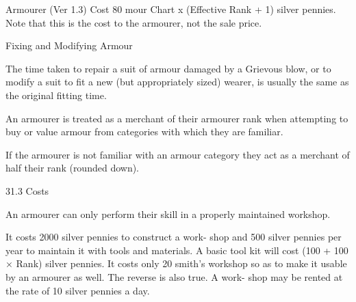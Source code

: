 \begin{Chapter}{Armourer (Ver 1.3)}
Cost  80%
mour  Chart  x  (Effective  Rank  +  1)  silver  pennies. 
Note  that  this  is  the  cost  to  the  armourer,  not  the 
sale price.  

Fixing and Modifying Armour  

The time taken to repair a suit of armour damaged 
by a Grievous blow, or to modify a suit to fit a new 
(but  appropriately  sized)  wearer,  is  usually  the 
same as the original fitting time. 

An  armourer  is  treated  as  a  merchant  of  their 
armourer rank when attempting to buy or value 
armour  from  categories  with  which  they  are 
familiar. 

If  the  armourer  is  not  familiar  with  an  armour 
category  they  act  as  a  merchant  of  half  their  rank 
(rounded down). 

31.3 Costs 

An  armourer  can  only  perform  their  skill  in  a 
properly maintained workshop. 

It  costs  2000  silver  pennies  to  construct  a  work-
shop and 500 silver pennies per year to maintain it 
with tools and materials. A basic tool kit will cost 
(100  +  100  ×  Rank)  silver  pennies.  It  costs  only 
20%
smith’s  workshop  so  as  to  make  it  usable  by  an 
armourer as well. The reverse is also true. A work-
shop may be rented at the rate of 10 silver pennies 
a day. 

\end{Chapter}
